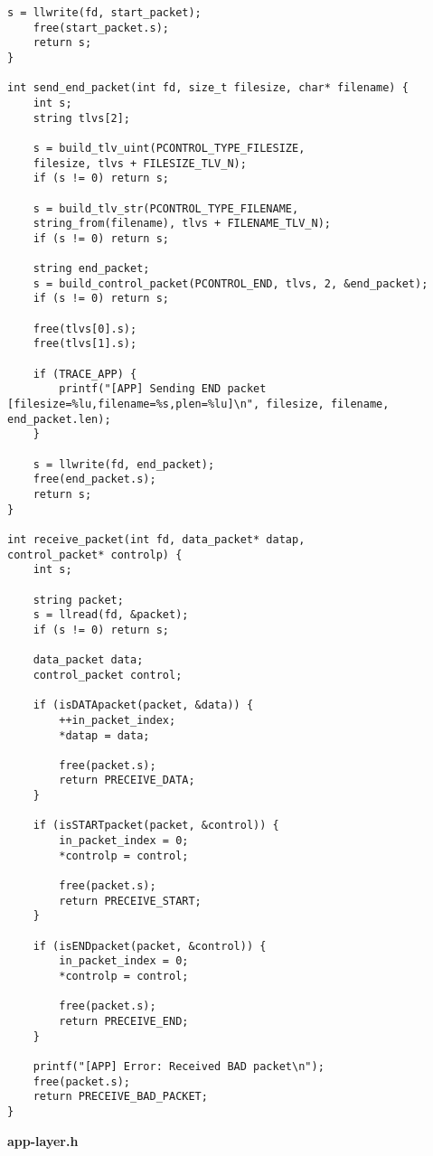\documentclass[subfiles]{main.tex}
\begin{document}
\begin{lstlisting}[style=rcom]
	s = llwrite(fd, start_packet);
	free(start_packet.s);
	return s;
}

int send_end_packet(int fd, size_t filesize, char* filename) {
	int s;
	string tlvs[2];
	
	s = build_tlv_uint(PCONTROL_TYPE_FILESIZE,
	filesize, tlvs + FILESIZE_TLV_N);
	if (s != 0) return s;
	
	s = build_tlv_str(PCONTROL_TYPE_FILENAME,
	string_from(filename), tlvs + FILENAME_TLV_N);
	if (s != 0) return s;
	
	string end_packet;
	s = build_control_packet(PCONTROL_END, tlvs, 2, &end_packet);
	if (s != 0) return s;
	
	free(tlvs[0].s);
	free(tlvs[1].s);
	
	if (TRACE_APP) {
		printf("[APP] Sending END packet [filesize=%lu,filename=%s,plen=%lu]\n", filesize, filename, end_packet.len);
	}
	
	s = llwrite(fd, end_packet);
	free(end_packet.s);
	return s;
}

int receive_packet(int fd, data_packet* datap,
control_packet* controlp) {
	int s;
	
	string packet;
	s = llread(fd, &packet);
	if (s != 0) return s;
	
	data_packet data;
	control_packet control;
	
	if (isDATApacket(packet, &data)) {
		++in_packet_index;
		*datap = data;
		
		free(packet.s);
		return PRECEIVE_DATA;
	}
	
	if (isSTARTpacket(packet, &control)) {
		in_packet_index = 0;
		*controlp = control;
		
		free(packet.s);
		return PRECEIVE_START;
	}
	
	if (isENDpacket(packet, &control)) {
		in_packet_index = 0;
		*controlp = control;
		
		free(packet.s);
		return PRECEIVE_END;
	}
	
	printf("[APP] Error: Received BAD packet\n");
	free(packet.s);
	return PRECEIVE_BAD_PACKET;
}
\end{lstlisting}

{\Large\textbf{app-layer.h}}
\end{document}

